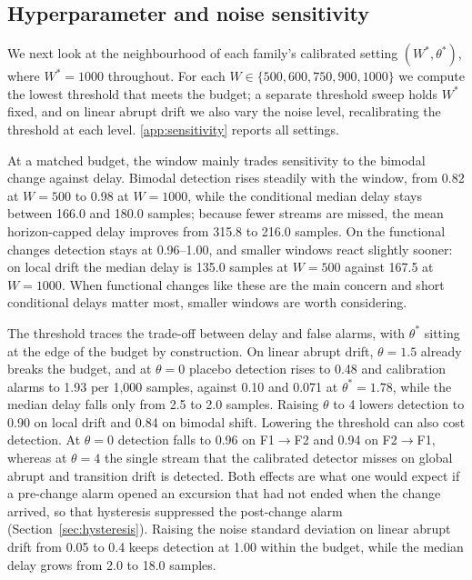 \documentclass[preprint,12pt]{elsarticle}
\begin{document}
\subsection{Hyperparameter and noise sensitivity}
\label{sec:sensitivity}
We next look at the neighbourhood of each family's calibrated setting $(W^*,\theta^*)$, where $W^*=1000$ throughout. For each $W\in\{500,600,750,900,1000\}$ we compute the lowest threshold that meets the budget; a separate threshold sweep holds $W^*$ fixed, and on linear abrupt drift we also vary the noise level, recalibrating the threshold at each level. \ref{app:sensitivity} reports all settings.

At a matched budget, the window mainly trades sensitivity to the bimodal change against delay. Bimodal detection rises steadily with the window, from 0.82 at $W=500$ to 0.98 at $W=1000$, while the conditional median delay stays between 166.0 and 180.0 samples; because fewer streams are missed, the mean horizon-capped delay improves from 315.8 to 216.0 samples. On the functional changes detection stays at 0.96--1.00, and smaller windows react slightly sooner: on local drift the median delay is 135.0 samples at $W=500$ against 167.5 at $W=1000$. When functional changes like these are the main concern and short conditional delays matter most, smaller windows are worth considering.

The threshold traces the trade-off between delay and false alarms, with $\theta^*$ sitting at the edge of the budget by construction. On linear abrupt drift, $\theta=1.5$ already breaks the budget, and at $\theta=0$ placebo detection rises to 0.48 and calibration alarms to 1.93 per 1,000 samples, against 0.10 and 0.071 at $\theta^*=1.78$, while the median delay falls only from 2.5 to 2.0 samples. Raising $\theta$ to 4 lowers detection to 0.90 on local drift and 0.84 on bimodal shift. Lowering the threshold can also cost detection. At $\theta=0$ detection falls to 0.96 on F1$\to$F2 and 0.94 on F2$\to$F1, whereas at $\theta=4$ the single stream that the calibrated detector misses on global abrupt and transition drift is detected. Both effects are what one would expect if a pre-change alarm opened an excursion that had not ended when the change arrived, so that hysteresis suppressed the post-change alarm (Section~\ref{sec:hysteresis}). Raising the noise standard deviation on linear abrupt drift from 0.05 to 0.4 keeps detection at 1.00 within the budget, while the median delay grows from 2.0 to 18.0 samples.
\end{document}
